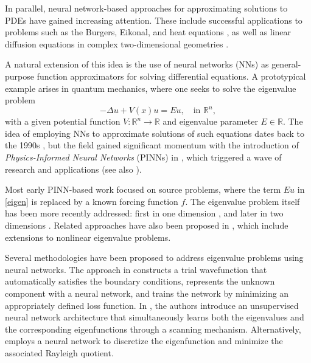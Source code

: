 \documentclass[reprint,superscriptaddress,aps,prl]{revtex4-2}
\newcommand{\R}{\mathbb{R}}
\begin{document}
In parallel, neural network-based approaches for approximating solutions to PDEs have gained increasing attention. These include successful applications to problems such as the Burgers, Eikonal, and heat equations \cite{Blechschmidt-Ernst}, as well as linear diffusion equations in complex two-dimensional geometries \cite{Berg-Nystrom}.

A natural extension of this idea is the use of neural networks (NNs) as general-purpose function approximators for solving differential equations. A prototypical example arises in quantum mechanics, where one seeks to solve the eigenvalue problem
\begin{equation}\label{eigen}
-\Delta u + V(x) u = E u,\quad \text{in } \R^n,
\end{equation}
with a given potential function \( V \colon \R^n \to \R \) and eigenvalue parameter \( E \in \R \). The idea of employing NNs to approximate solutions of such equations dates back to the 1990s \cite{Lagaris-Likas-Fotiadis}, but the field gained significant momentum with the introduction of {\em Physics-Informed Neural Networks} (PINNs) in \cite{Raissi-Perdiakaris-Karniadakis}, which triggered a wave of research and applications (see also \cite{Raissi-Perdiakaris-Karniadakis2, Karniadakis-etal}).

Most early PINN-based work focused on source problems, where the term \( E u \) in \eqref{eigen} is replaced by a known forcing function \( f \). The eigenvalue problem itself has been more recently addressed: first in one dimension \cite{Jin-Mattheakis-Protopapas1, Jin-Mattheakis-Protopapas2, Sakar}, and later in two dimensions \cite{Holliday-Lindner-Ditto}. Related approaches have also been proposed in \cite{Rowan-Evans-Maute-Dootsan}, which include extensions to nonlinear eigenvalue problems.

 
Several methodologies have been proposed to address eigenvalue problems using neural networks.
The approach in \cite{Sakar} constructs a trial wavefunction that automatically satisfies the boundary conditions, represents the unknown component with a neural network, and trains the network by minimizing an appropriately defined loss function.
%
In \cite{Jin-Mattheakis-Protopapas1, Jin-Mattheakis-Protopapas2}, the authors introduce an unsupervised neural network architecture that simultaneously learns both the eigenvalues and the corresponding eigenfunctions through a scanning mechanism.
%
Alternatively, \cite{Rowan-Evans-Maute-Dootsan} employs a neural network to discretize the eigenfunction and minimize the associated Rayleigh quotient.
\end{document}
